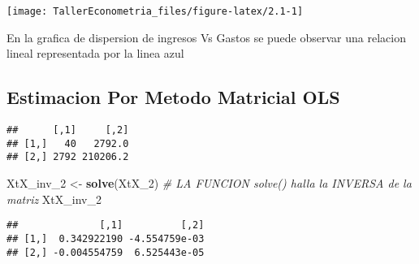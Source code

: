 \documentclass[
]{article}
\newenvironment{Shaded}{\begin{snugshade}}{\end{snugshade}}
\newcommand{\CommentTok}[1]{\textcolor[rgb]{0.56,0.35,0.01}{\textit{#1}}}
\newcommand{\DecValTok}[1]{\textcolor[rgb]{0.00,0.00,0.81}{#1}}
\newcommand{\KeywordTok}[1]{\textcolor[rgb]{0.13,0.29,0.53}{\textbf{#1}}}
\newcommand{\NormalTok}[1]{#1}
\newcommand{\OperatorTok}[1]{\textcolor[rgb]{0.81,0.36,0.00}{\textbf{#1}}}
\newcommand{\StringTok}[1]{\textcolor[rgb]{0.31,0.60,0.02}{#1}}
\begin{document}
\begin{center}\texttt{[image: TallerEconometria\_files/figure-latex/2.1-1]} \end{center}

En la grafica de dispersion de ingresos Vs Gastos se puede observar una
relacion lineal representada por la linea azul

\hypertarget{estimacion-por-metodo-matricial-ols}{%
\subsection{Estimacion Por Metodo Matricial
OLS}\label{estimacion-por-metodo-matricial-ols}}

\begin{Shaded}
\end{Shaded}

\begin{verbatim}
##      [,1]     [,2]
## [1,]   40   2792.0
## [2,] 2792 210206.2
\end{verbatim}

\begin{Shaded}
\begin{Highlighting}[]
\NormalTok{XtX_inv_}\DecValTok{2}\NormalTok{ <-}\StringTok{ }\KeywordTok{solve}\NormalTok{(XtX_}\DecValTok{2}\NormalTok{)  }\CommentTok{# LA FUNCION solve() halla la INVERSA de la matriz }
\NormalTok{XtX_inv_}\DecValTok{2}
\end{Highlighting}
\end{Shaded}

\begin{verbatim}
##              [,1]          [,2]
## [1,]  0.342922190 -4.554759e-03
## [2,] -0.004554759  6.525443e-05
\end{verbatim}

\begin{Shaded}
\end{Shaded}
\end{document}
